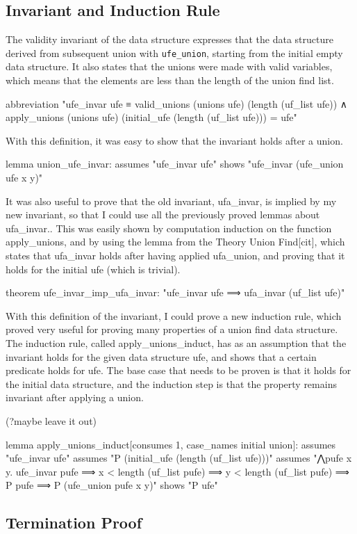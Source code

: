 \subsection{Invariant and Induction Rule}

The validity invariant of the data structure expresses that the data structure derived from subsequent union with \lstinline{ufe_union}, starting from the initial empty data structure. 
It also states that the unions were made with valid variables, which means that the elements are less than the length of the union find list.

abbreviation "ufe_invar ufe ≡ 
valid_unions (unions ufe) (length (uf_list ufe)) ∧
apply_unions (unions ufe) (initial_ufe (length (uf_list ufe))) = ufe"

With this definition, it was easy to show that the invariant holds after a union. 

lemma union_ufe_invar:
assumes "ufe_invar ufe"
shows "ufe_invar (ufe_union ufe x y)"

It was also useful to prove that the old invariant, ufa_invar, is implied by my new invariant, so that I could use all the previously proved lemmas about ufa_invar.. This was easily shown by computation induction on the function apply_unions, and by using the lemma from the Theory Union Find[cit], which states that ufa_invar holds after having applied ufa_union, and proving that it holds for the initial ufe (which is trivial).

theorem ufe_invar_imp_ufa_invar: "ufe_invar ufe ⟹ ufa_invar (uf_list ufe)"

With this definition of the invariant, I could prove a new induction rule, which proved very useful for proving many properties of a union find data structure. The induction rule, called apply_unions_induct, has as an assumption that the invariant holds for the given data structure ufe, and shows that a certain predicate holds for ufe. The base case that needs to be proven is that it holds for the initial data structure, and the induction step is that the property remains invariant after applying a union. 

(?maybe leave it out)

lemma apply_unions_induct[consumes 1, case_names initial union]:
assumes "ufe_invar ufe"
assumes "P (initial_ufe (length (uf_list ufe)))"
assumes "⋀pufe x y. ufe_invar pufe ⟹ x < length (uf_list pufe) ⟹ y < length (uf_list pufe)
⟹ P pufe ⟹ P (ufe_union pufe x y)"
shows "P ufe"


\subsection{Termination Proof}

